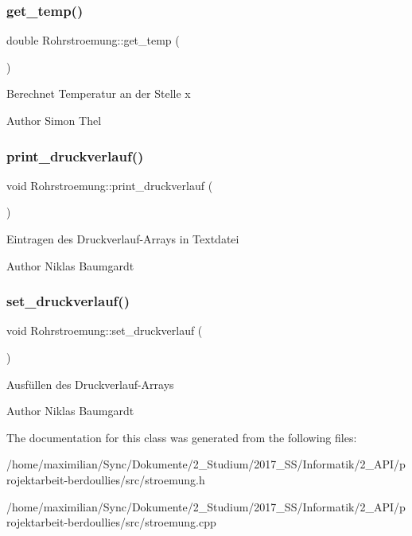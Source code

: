 \subsubsection{\texorpdfstring{get\+\_\+temp()}{get\_temp()}\hspace{0.1cm}{\footnotesize\ttfamily [2/2]}}
{\footnotesize\ttfamily double Rohrstroemung\+::get\+\_\+temp (\begin{DoxyParamCaption}{ }\end{DoxyParamCaption})}

Berechnet Temperatur an der Stelle x \begin{DoxyAuthor}{Author}
Simon Thel 
\end{DoxyAuthor}
\mbox{\label{class_rohrstroemung_a3adc6cad22e5ab2132b3d82b7368ba8e}} 
\subsubsection{\texorpdfstring{print\+\_\+druckverlauf()}{print\_druckverlauf()}}
{\footnotesize\ttfamily void Rohrstroemung\+::print\+\_\+druckverlauf (\begin{DoxyParamCaption}{ }\end{DoxyParamCaption})}

Eintragen des Druckverlauf-\/\+Arrays in Textdatei \begin{DoxyAuthor}{Author}
Niklas Baumgardt 
\end{DoxyAuthor}
\mbox{\label{class_rohrstroemung_ade5cf2d08a2c2c23d951d54ff2d05325}} 
\subsubsection{\texorpdfstring{set\+\_\+druckverlauf()}{set\_druckverlauf()}}
{\footnotesize\ttfamily void Rohrstroemung\+::set\+\_\+druckverlauf (\begin{DoxyParamCaption}{ }\end{DoxyParamCaption})}

Ausfüllen des Druckverlauf-\/\+Arrays \begin{DoxyAuthor}{Author}
Niklas Baumgardt 
\end{DoxyAuthor}


The documentation for this class was generated from the following files\+:\begin{DoxyCompactItemize}
\item 
/home/maximilian/\+Sync/\+Dokumente/2\+\_\+\+Studium/2017\+\_\+\+S\+S/\+Informatik/2\+\_\+\+A\+P\+I/projektarbeit-\/berdoullies/src/stroemung.\+h\item 
/home/maximilian/\+Sync/\+Dokumente/2\+\_\+\+Studium/2017\+\_\+\+S\+S/\+Informatik/2\+\_\+\+A\+P\+I/projektarbeit-\/berdoullies/src/stroemung.\+cpp\end{DoxyCompactItemize}
